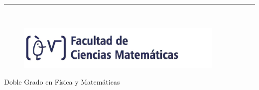\begin{titlepage}
\begin{center}
    \vspace*{0.5in}
    
    \rule{110mm}{0.1mm}\\
    
    
    \hspace{-0.5cm}
    \begin{minipage}[t]{.45\textwidth}
    \raggedleft
    \begin{figure}[H]
    
    \includegraphics[width=10cm]{LogoFac_Esp.jpg}
    \end{figure}
    \end{minipage}
    \hfill
    \noindent 
    \begin{minipage}[t]{.45\textwidth}
    \raggedleft
    
    \vspace{1.7cm}
    \hspace{-2cm}
    \begin{Large}\hspace{-0.5cm}
    Doble Grado en Física y Matemáticas\\
    \end{Large}
    \end{minipage}
    \end{center}
    \end{titlepage}